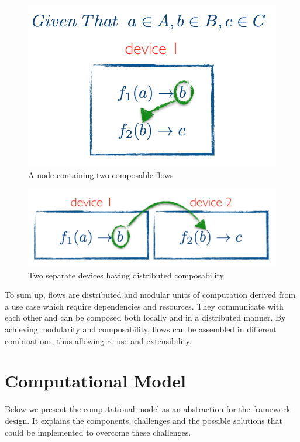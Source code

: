\begin{figure}[H]
	\centering
	\includegraphics[scale=0.5]{images/local-compose.png} 
 	\caption{A node containing two composable flows}
	\label{fig:compose}
\end{figure}
\begin{figure}[H]
	\centering
	\includegraphics[scale=0.5]{images/distributed-compose.png}
	\caption{Two separate devices having distributed composability}
	\label{fig:compose2}
\end{figure}

\noindent To sum up, flows are distributed and modular units of computation derived from a use case which require dependencies and resources. They communicate with each other and can be composed both locally and in a distributed manner. By achieving  modularity and composability, flows can be assembled in different combinations, thus allowing re-use and extensibility.
\newpage
\section{Computational Model}

Below we present the computational model as an abstraction for the framework design. It explains the components, challenges and the possible solutions that could be implemented to overcome these challenges. 	

